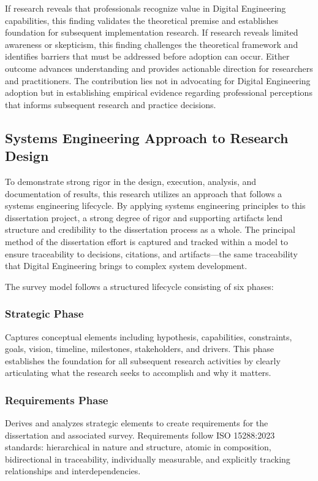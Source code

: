 If research reveals that professionals recognize value in Digital Engineering capabilities, this finding validates the theoretical premise and establishes foundation for subsequent implementation research. If research reveals limited awareness or skepticism, this finding challenges the theoretical framework and identifies barriers that must be addressed before adoption can occur. Either outcome advances understanding and provides actionable direction for researchers and practitioners. The contribution lies not in advocating for Digital Engineering adoption but in establishing empirical evidence regarding professional perceptions that informs subsequent research and practice decisions.

\subsection{Systems Engineering Approach to Research Design}

To demonstrate strong rigor in the design, execution, analysis, and documentation of results, this research utilizes an approach that follows a systems engineering lifecycle. By applying systems engineering principles to this dissertation project, a strong degree of rigor and supporting artifacts lend structure and credibility to the dissertation process as a whole. The principal method of the dissertation effort is captured and tracked within a model to ensure traceability to decisions, citations, and artifacts---the same traceability that Digital Engineering brings to complex system development.

The survey model follows a structured lifecycle consisting of six phases:

\subsubsection{Strategic Phase}

Captures conceptual elements including hypothesis, capabilities, constraints, goals, vision, timeline, milestones, stakeholders, and drivers. This phase establishes the foundation for all subsequent research activities by clearly articulating what the research seeks to accomplish and why it matters.

\subsubsection{Requirements Phase}

Derives and analyzes strategic elements to create requirements for the dissertation and associated survey. Requirements follow ISO 15288:2023 standards: hierarchical in nature and structure, atomic in composition, bidirectional in traceability, individually measurable, and explicitly tracking relationships and interdependencies.

